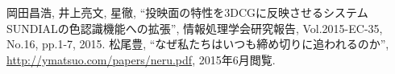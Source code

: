 %
%

\begin{theachievement}{99}
   岡田昌浩, 井上亮文, 星徹, ``投映面の特性を3DCGに反映させるシステムSUNDIALの色認識機能への拡張'', 情報処理学会研究報告, Vol.2015-EC-35, No.16, pp.1-7, 2015.
   松尾豊, ``なぜ私たちはいつも締め切りに追われるのか'', \url{http://ymatsuo.com/papers/neru.pdf}, 2015年6月閲覧.
\end{theachievement}
